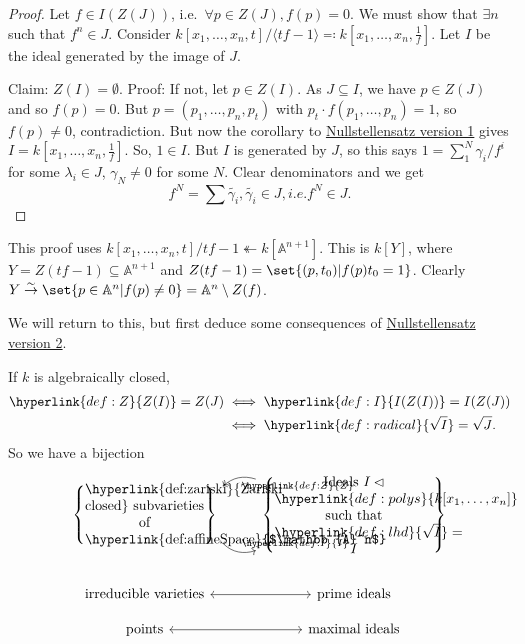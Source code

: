 \documentclass{article}
\newcommand{\A}{\mathbb{A}}
\begin{document}
\color{gray}
\begin{proof}
    Let $f \in I(Z(J))$, i.e.\ $\forall p \in Z(J), f(p) = 0$.
    We must show that $\exists n$ such that $f^n \in J$.
    Consider $k[x_1, \dotsc, x_n, t]/\langle tf-1 \rangle \eqqcolon k[x_1, \dotsc, x_n, \frac{1}{f}]$.
    Let $I$ be the ideal generated by the image of $J$.

    Claim: $Z(I) = \emptyset$. Proof: If not, let $p \in Z(I)$. As $J \subseteq I$, we have $p \in Z(J)$ and so $f(p) = 0$. But $p=(p_1, \dotsc, p_n, p_t)$ with $p_t \cdot f(p_1, \dotsc, p_n) = 1$, so $f(p) \neq 0$, contradiction.
    But now the corollary to \hyperlink{def:null1}{Nullstellensatz version 1} gives $I=k[x_1, \dotsc, x_n, \frac{1}{f}]$. So, $1 \in I$. But $I$ is generated by $J$, so this says $1 = \sum_1^N \gamma_i/f^i$ for some $\lambda_i \in J$, $\gamma_N \neq 0$ for some $N$.
    Clear denominators and we get
    \begin{equation*}
        f^N = \sum \tilde{\gamma_i}, \tilde{\gamma_i} \in J, i.e. f^N \in J.
    \end{equation*}
\end{proof}
\begin{remark}
    This proof uses $k[x_1, \dotsc, x_n, t]/tf-1 \twoheadleftarrow k[\A^{n+1}]$. This is $k[Y]$, where $Y = Z(tf-1) \subseteq \A^{n+1}$ and $Z(tf-1) = \set{(p, t_0) | f(p) t_0 = 1}$.
    Clearly $Y \overset{\sim}{\rightarrow} \set{p \in \A^n | f(p) \neq 0} = \A^n \setminus Z(f)$.
\end{remark}
\color{black}
We will return to this, but first deduce some consequences of \hyperlink{def:null2}{Nullstellensatz version 2}.
\begin{cor}
    If $k$ is algebraically closed,
    \begin{align*}\hyperlink{def:Z}{Z(I)} = Z(J) &\iff \hyperlink{def:I}{I(Z(I))} = I(Z(J))\\ &\iff \hyperlink{def:radical}{\sqrt{I}} = \sqrt{J}.\end{align*}
    So we have a bijection
    \begin{equation*}
        \begin{tikzcd}[row sep=small]
            \left\{\parbox{3cm}{\centering \hyperlink{def:zariski}{Zariski closed} subvarieties of \hyperlink{def:affineSpace}{$\A^n$}}\right\}
            \ar[r, bend right, hookrightarrow, "\hyperlink{def:I}{I}", start anchor=-20, end anchor=200]&
            \left\{\parbox{4cm}{\centering Ideals $I \lhd \hyperlink{def:polys}{k[x_1, \dotsc, x_n]}$ such that $\hyperlink{def:lhd}{\sqrt{I}}=I$}\right\}
            \ar[l, bend right, two heads, "\hyperlink{def:Z}{Z}", start anchor=160, end anchor=20] \\ \\
            \text{irreducible varieties} \ar[r, leftrightarrow] & \text{prime ideals} \\
            \text{points} \rar[leftrightarrow] & \text{maximal ideals} \\
        \end{tikzcd}
    \end{equation*}
\end{cor}
\end{document}
